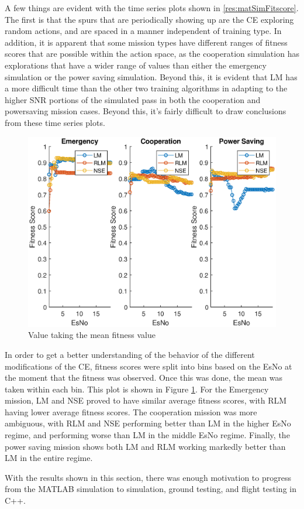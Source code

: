 \par A few things are evident with the time series plots shown in \ref{res:matSimFitscore}. The first is that the spurs that are periodically showing up are the CE exploring random actions, and are spaced in a manner independent of training type. In addition, it is apparent that some mission types have different ranges of fitness scores that are possible within the action space, as the cooperation simulation has explorations that have a wider range of values than either the emergency simulation or the power saving simulation. Beyond this, it is evident that LM has a more difficult time than the other two training algorithms in adapting to the higher SNR portions of the simulated pass in both the cooperation and powersaving mission cases. Beyond this, it's fairly difficult to draw conclusions from these time series plots.
\begin{figure}
\centering
\includegraphics[width=\textwidth]{figures/matlab_sim_results/binnedMeans_sim.eps}
\caption{Value taking the mean fitness value}
\label{res:matSimBinMean}
\end{figure}
\par In order to get a better understanding of the behavior of the different modifications of the CE, fitness scores were split into bins based on the EsNo at the moment that the fitness was observed. Once this was done, the mean was taken within each bin. This plot is shown in Figure \ref{res:matSimBinMean}. For the Emergency mission, LM and NSE proved to have similar average fitness scores, with RLM having lower average fitness scores. The cooperation mission was more ambiguous, with RLM and NSE performing better than LM in the higher EsNo regime, and performing worse than LM in the middle EsNo regime. Finally, the power saving mission shows both LM and RLM working markedly better than LM in the entire regime.
\par With the results shown in this section, there was enough motivation to progress from the MATLAB simulation to simulation, ground testing, and flight testing in C++. 
\clearpage
